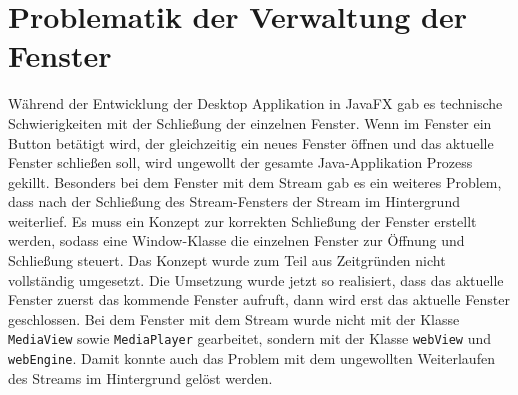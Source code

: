 \section{Problematik der Verwaltung der Fenster}
Während der Entwicklung der Desktop Applikation in JavaFX gab es technische Schwierigkeiten mit der Schließung der einzelnen Fenster. Wenn im Fenster ein Button betätigt wird, der gleichzeitig ein neues Fenster öffnen und das aktuelle Fenster schließen soll, wird ungewollt der gesamte Java-Applikation Prozess gekillt. Besonders bei dem Fenster mit dem Stream gab es ein weiteres Problem, dass nach der Schließung des Stream-Fensters der Stream im Hintergrund weiterlief. Es muss ein Konzept zur korrekten Schließung der Fenster erstellt werden, sodass eine Window-Klasse die einzelnen Fenster zur Öffnung und Schließung steuert. Das Konzept wurde zum Teil aus Zeitgründen nicht vollständig umgesetzt. Die Umsetzung wurde jetzt so realisiert, dass das aktuelle Fenster zuerst das kommende Fenster aufruft, dann wird erst das aktuelle Fenster geschlossen. Bei dem Fenster mit dem Stream wurde nicht mit der Klasse \texttt{MediaView} sowie \texttt{MediaPlayer} gearbeitet, sondern mit der Klasse \texttt{webView} und \texttt{webEngine}. Damit konnte auch das Problem mit dem ungewollten Weiterlaufen des Streams im Hintergrund gelöst werden.